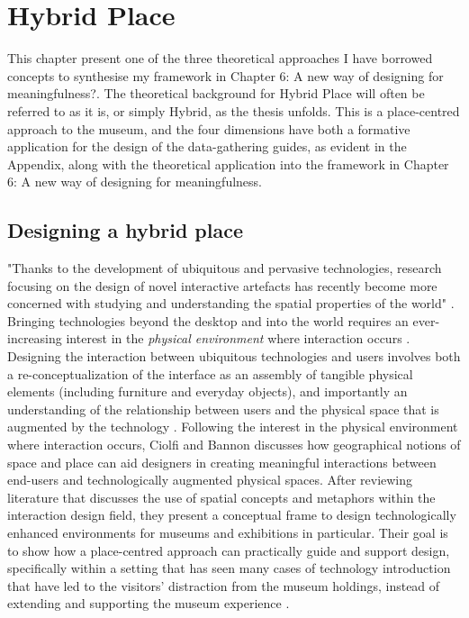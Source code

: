 
\section{Hybrid Place}
This chapter present one of the three theoretical approaches I have borrowed concepts to synthesise my framework in Chapter 6: A new way of designing for meaningfulness?. The theoretical background for Hybrid Place will often be referred to as it is, or simply Hybrid, as the thesis unfolds. This is a place-centred approach to the museum, and the four dimensions have both a formative application for the design of the data-gathering guides, as evident in the Appendix, along with the theoretical application into the framework in Chapter 6: A new way of designing for meaningfulness.

\subsection{Designing a hybrid place}
"Thanks to the development of ubiquitous and pervasive technologies, research focusing on the design of novel interactive artefacts has recently become more concerned with studying and understanding the spatial properties of the world" \autocite[p. 159]{hybridplace_ciolfi}. Bringing technologies beyond the desktop and into the world requires an ever-increasing interest in the \emph{physical environment} where interaction occurs \autocite[p. 159]{hybridplace_ciolfi}. Designing the interaction between ubiquitous technologies and users involves both a re-conceptualization of the interface as an assembly of tangible physical elements (including furniture and everyday objects), and importantly an understanding of the relationship between users and the physical space that is augmented by the technology \autocite[p. 159]{hybridplace_ciolfi}. Following the interest in the physical environment where interaction occurs, Ciolfi and Bannon discusses how geographical notions of space and place can aid designers in creating meaningful interactions between end-users and technologically augmented physical spaces. After reviewing literature that discusses the use of spatial concepts and metaphors within the interaction design field, they present a conceptual frame to design technologically enhanced environments for museums and exhibitions in particular. Their goal is to show how a place-centred approach can practically guide and support design, specifically within a setting that has seen many cases of technology introduction that have led to the visitors' distraction from the museum holdings, instead of extending and supporting the museum experience \autocite[p. 159-160]{hybridplace_ciolfi}.


